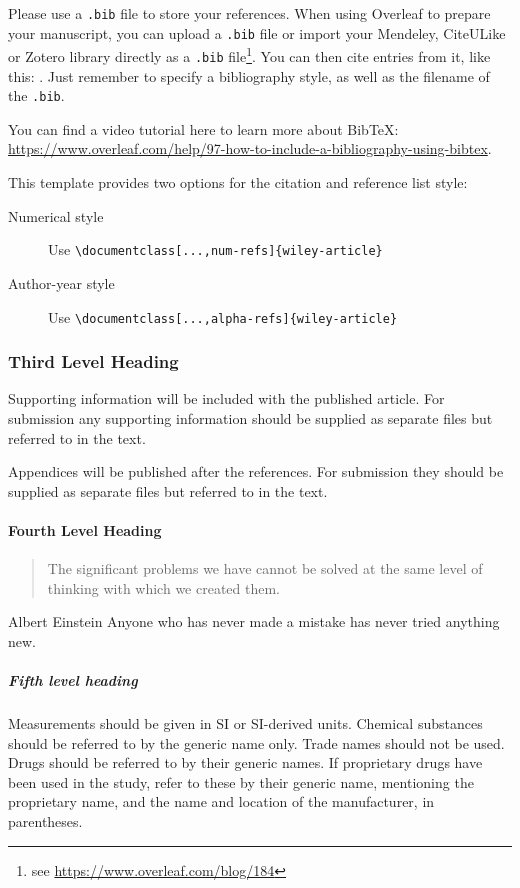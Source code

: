 \documentclass[num-refs]{wiley-article}
\begin{document}
Please use a \verb|.bib| file to store your references. When using Overleaf to prepare your manuscript, you can upload a \verb|.bib| file or import your Mendeley, CiteULike or Zotero library directly as a \verb|.bib| file\footnote{see \url{https://www.overleaf.com/blog/184}}. You can then cite entries from it, like this: \cite{Gregori2012}. Just remember to specify a bibliography style, as well as the filename of the \verb|.bib|.

You can find a video tutorial here to learn more about BibTeX: \url{https://www.overleaf.com/help/97-how-to-include-a-bibliography-using-bibtex}.

This template provides two options for the citation and reference list style: 
\begin{description}
\item[Numerical style] Use \verb|\documentclass[...,num-refs]{wiley-article}|
\item[Author-year style] Use \verb|\documentclass[...,alpha-refs]{wiley-article}|
\end{description}

\subsubsection{Third Level Heading}
Supporting information will be included with the published article. For submission any supporting information should be supplied as separate files but referred to in the text.

Appendices will be published after the references. For submission they should be supplied as separate files but referred to in the text.

\paragraph{Fourth Level Heading}
\begin{quote}
The significant problems we have cannot be solved at the same level of thinking with which we created them.
\end{quote}

\begin{epigraph}{Albert Einstein}
Anyone who has never made a mistake has never tried anything new.
\end{epigraph}

\subparagraph{Fifth level heading}
Measurements should be given in SI or SI-derived units.
Chemical substances should be referred to by the generic name only. Trade names should not be used. Drugs should be referred to by their generic names. If proprietary drugs have been used in the study, refer to these by their generic name, mentioning the proprietary name, and the name and location of the manufacturer, in parentheses.
\end{document}
